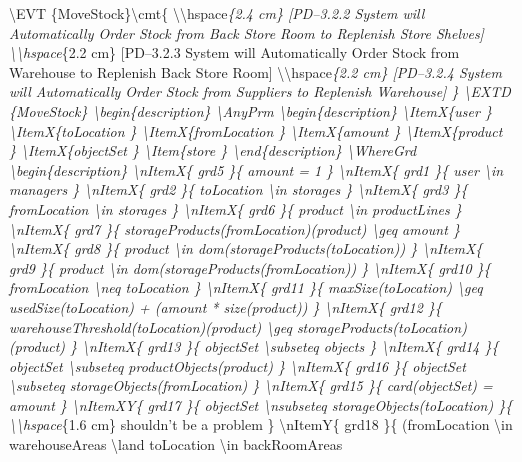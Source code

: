 \textbackslash{}EVT \{MoveStock\}\textbackslash{}cmt\{ \textbackslash{}\textbackslash{}hspace\emph{\{2.4 cm\} [PD--3.2.2 System will Automatically Order Stock from Back Store Room to Replenish Store Shelves]
\textbackslash{}\textbackslash{}hspace}\{2.2 cm\} [PD--3.2.3 System will Automatically Order Stock from Warehouse to Replenish Back Store Room]
\textbackslash{}\textbackslash{}hspace\emph{\{2.2 cm\} [PD--3.2.4 System will Automatically Order Stock from Suppliers to Replenish Warehouse] \}
\textbackslash{}EXTD \{MoveStock\}
\textbackslash{}begin\{description\}
\textbackslash{}AnyPrm
\textbackslash{}begin\{description\}
\textbackslash{}ItemX\{user \}
\textbackslash{}ItemX\{toLocation \}
\textbackslash{}ItemX\{fromLocation \}
\textbackslash{}ItemX\{amount \}
\textbackslash{}ItemX\{product \}
\textbackslash{}ItemX\{objectSet \}
\textbackslash{}Item\{store \}
\textbackslash{}end\{description\}
\textbackslash{}WhereGrd
\textbackslash{}begin\{description\}
\textbackslash{}nItemX\{ grd5 \}\{ amount = 1 \}
\textbackslash{}nItemX\{ grd1 \}\{ user \textbackslash{}in managers \}
\textbackslash{}nItemX\{ grd2 \}\{ toLocation \textbackslash{}in storages \}
\textbackslash{}nItemX\{ grd3 \}\{ fromLocation \textbackslash{}in storages \}
\textbackslash{}nItemX\{ grd6 \}\{ product \textbackslash{}in productLines \}
\textbackslash{}nItemX\{ grd7 \}\{ storageProducts(fromLocation)(product) \textbackslash{}geq amount \}
\textbackslash{}nItemX\{ grd8 \}\{ product \textbackslash{}in dom(storageProducts(toLocation)) \}
\textbackslash{}nItemX\{ grd9 \}\{ product \textbackslash{}in dom(storageProducts(fromLocation)) \}
\textbackslash{}nItemX\{ grd10 \}\{ fromLocation \textbackslash{}neq toLocation \}
\textbackslash{}nItemX\{ grd11 \}\{ maxSize(toLocation) \textbackslash{}geq usedSize(toLocation) + (amount * size(product)) \}
\textbackslash{}nItemX\{ grd12 \}\{ warehouseThreshold(toLocation)(product) \textbackslash{}geq storageProducts(toLocation)(product) \}
\textbackslash{}nItemX\{ grd13 \}\{ objectSet \textbackslash{}subseteq objects \}
\textbackslash{}nItemX\{ grd14 \}\{ objectSet \textbackslash{}subseteq productObjects(product) \}
\textbackslash{}nItemX\{ grd16 \}\{ objectSet \textbackslash{}subseteq storageObjects(fromLocation) \}
\textbackslash{}nItemX\{ grd15 \}\{ card(objectSet) = amount \}
\textbackslash{}nItemXY\{ grd17 \}\{ objectSet \textbackslash{}nsubseteq storageObjects(toLocation) \}\{ \textbackslash{}\textbackslash{}hspace}\{1.6 cm\} shouldn't be a problem \}
\textbackslash{}nItemY\{ grd18 \}\{ (fromLocation \textbackslash{}in warehouseAreas \textbackslash{}land toLocation \textbackslash{}in backRoomAreas
